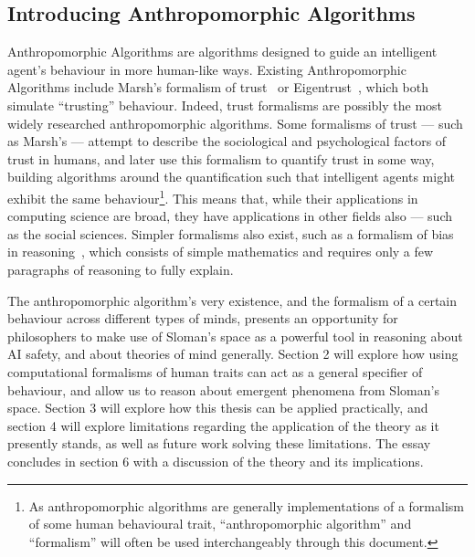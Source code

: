 \subsection{Introducing Anthropomorphic Algorithms}
Anthropomorphic Algorithms are algorithms designed to guide an intelligent agent's behaviour in more human-like ways. Existing Anthropomorphic Algorithms include Marsh's formalism of trust~\citep{Marsh1994FormalisingConcept} or Eigentrust~\citep{eigentrust}, which both simulate ``trusting'' behaviour. Indeed, trust formalisms are possibly the most widely researched anthropomorphic algorithms. Some formalisms of trust --- such as Marsh's --- attempt to describe the sociological and psychological factors of trust in humans, and later use this formalism to quantify trust in some way, building algorithms around the quantification such that intelligent agents might exhibit the same behaviour\footnote{As anthropomorphic algorithms are generally implementations of a formalism of some human behavioural trait, ``anthropomorphic algorithm'' and ``formalism'' will often be used interchangeably through this document.}. This means that, while their applications in computing science are broad, they have applications in other fields also --- such as the social sciences. Simpler formalisms also exist, such as a formalism of bias in reasoning~\cite{armstrong_bias}, which consists of simple mathematics and requires only a few paragraphs of reasoning to fully explain.\par

The anthropomorphic algorithm's very existence, and the formalism of a certain behaviour across different types of minds, presents an opportunity for philosophers to make use of Sloman's space as a powerful tool in reasoning about AI safety, and about theories of mind generally. Section 2 will explore how using computational formalisms of human traits can act as a general specifier of behaviour, and allow us to reason about emergent phenomena from Sloman's space. Section 3 will explore how this thesis can be applied practically, and section 4 will explore limitations regarding the application of the theory as it presently stands, as well as future work solving these limitations. The essay concludes in section 6 with a discussion of the theory and its implications.\par
